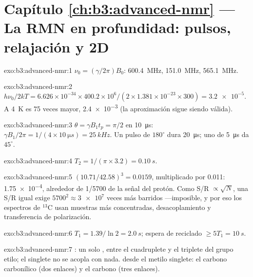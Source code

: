 \section*{Capítulo \ref{ch:b3:advanced-nmr} --- La RMN en profundidad: pulsos, relajación y 2D}

\begin{solution}{exo:b3:advanced-nmr:1}
$\nu_0 = (\gamma/2\pi)B_0$:  \qty{600.4}{MHz},  \qty{151.0}{MHz}, 
\qty{565.1}{MHz}.
\end{solution}

\begin{solution}{exo:b3:advanced-nmr:2}
$h\nu_0/2kT = 6.626\times10^{-34} \times 400.2\times10^6/(2 \times 1.381\times10^{-23} \times 300)
= \num{3.2e-5}$. A \qty{4}{K} es 75 veces mayor, \num{2.4e-3} (la aproximación
sigue siendo válida).
\end{solution}

\begin{solution}{exo:b3:advanced-nmr:3}
$\theta = \gamma B_1t_p = \pi/2$ en \qty{10}{\micro s}: $\gamma B_1/2\pi = 1/(4 \times
\qty{10}{\micro s}) = \qty{25}{kHz}$. Un pulso de $180^\circ$ dura \qty{20}{\micro s}; uno de \qty{5}{\micro s}
da $45^\circ$.
\end{solution}

\begin{solution}{exo:b3:advanced-nmr:4}
$T_2 = 1/(\pi \times 3.2) = \qty{0.10}{s}$.
\end{solution}

\begin{solution}{exo:b3:advanced-nmr:5}
$(10.71/42.58)^3 = 0.0159$, multiplicado por 0.011: \num{1.75e-4}, alrededor de 1/5700 de la señal
del protón. Como S/R $\propto\sqrt N$, una S/R igual exige $5700^2 \approx \num{3e7}$ veces más
barridos ---imposible, y por eso los espectros de ${}^{13}$C usan muestras más concentradas,
desacoplamiento y transferencia de polarización.
\end{solution}

\begin{solution}{exo:b3:advanced-nmr:6}
$T_1 = 1.39/\ln2 = \qty{2.0}{s}$; espera de reciclado $\ge 5T_1 = \qty{10}{s}$.
\end{solution}

\begin{solution}{exo:b3:advanced-nmr:7}
: un solo , entre el cuadruplete  y el triplete  del
grupo etilo; el singlete  no se acopla con nada.  desde el metilo singlete:
el carbono carbonílico (dos enlaces) y el carbono  (tres enlaces).
\end{solution}

